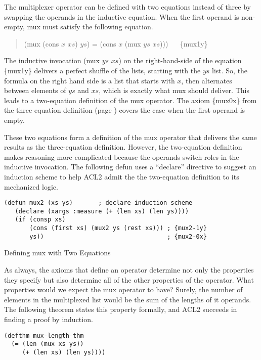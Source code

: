 \begin{aside}
The multiplexer operator can be defined with two equations instead of three
by swapping the operands in the inductive equation.
When the first operand is non-empty, mux must satisfy the following equation.
\begin{quote}
(mux (cons $x$ $xs$) $ys$) = (cons $x$ (mux $ys$ $xs$))) ~~ \{mux1y\}
\end{quote}

The inductive invocation (mux $ys$ $xs$)
on the right-hand-side of the equation \{mux1y\}
delivers a perfect shuffle of the lists,
starting with the $ys$ list.
So, the formula on the right hand side is a list that starts with $x$,
then alternates between elements of $ys$ and $xs$, which is exactly what
mux should deliver. This leads to a two-equation definition of the mux operator.
The axiom \{mux0x\} from the three-equation definition
(page \pageref{def:mux})
covers the case when the first operand is empty.

These two equations form a definition of the mux operator
that delivers the same results as the three-equation definition.
However, the two-equation definition makes reasoning more complicated
because the operands switch roles in the inductive invocation.
The following defun uses a ``declare'' directive to suggest
an induction scheme to help ACL2 admit
the the two-equation definition to its mechanized logic.

\label{mux-2eq-defun}
\begin{Verbatim}
(defun mux2 (xs ys)       ; declare induction scheme
   (declare (xargs :measure (+ (len xs) (len ys))))
   (if (consp xs)
       (cons (first xs) (mux2 ys (rest xs))) ; {mux2-1y}
       ys))                                  ; {mux2-0x}
\end{Verbatim}
\caption{Defining mux with Two Equations}
\label{aside:mux-2eq}
\end{aside}

As always, the axioms that define an operator
determine not only the properties they specify
but also determine all of the other properties of the operator.
What properties would we expect the mux operator to have?
Surely, the number of elements in the multiplexed list
would be the sum of the lengths of it operands.
The following theorem states this property formally,
and ACL2 succeeds in finding a proof by induction.

\label{mux-length-thm}
\begin{Verbatim}
(defthm mux-length-thm
  (= (len (mux xs ys))
     (+ (len xs) (len ys))))
\end{Verbatim}

